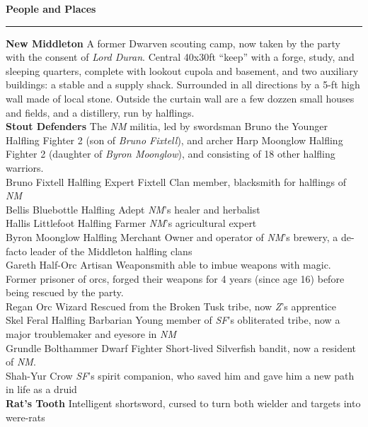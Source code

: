 \documentclass[letterpaper]{article}
\newcommand{\e}[1]{\emph{#1}}
\newcommand{\B}[1]{\textbf{#1}}
\newenvironment{notesection}[1]
{ {\huge \B{#1}}\hrule\vspace{0.5em}\begingroup\fontsize{9pt}{12pt}\selectfont}
{\endgroup}
\newcommand{\person}[3]{#1\B{
    \ifstrequal{#2}{M}{{\color{ProcessBlue}\male}}{%
    \ifstrequal{#2}{F}{\color{VioletRed}\female}{}}} #3}
\begin{document}
\begin{notesection}{People and Places}
\B{New Middleton} A former Dwarven scouting camp, now taken by the party with the consent of \e{Lord Duran}.  Central 40x30ft ``keep'' with a forge, study, and sleeping quarters, complete with lookout cupola and basement, and two auxiliary buildings: a stable and a supply shack. Surrounded in all directions by a 5-ft high wall made of local stone. Outside the curtain wall are a few dozzen small houses and fields, and a distillery, run by halflings. \\
\B{Stout Defenders} The \e{NM} militia, led by swordsman \person{Bruno the Younger}{M}{Halfling Fighter 2} (son of \e{Bruno Fixtell}), and archer \person{Harp Moonglow}{F}{Halfling Fighter 2} (daughter of \e{Byron Moonglow}), and consisting of 18 other halfling warriors.\\
\person{Bruno Fixtell}{M}{Halfling Expert} Fixtell Clan member, blacksmith for halflings of \e{NM} \\
\person{Bellis Bluebottle}{F}{Halfling Adept} \e{NM}'s healer and herbalist \\
\person{Hallis Littlefoot}{F}{Halfling Farmer} \e{NM}'s agricultural expert \\
\person{Byron Moonglow}{M}{Halfling Merchant} Owner and operator of \e{NM}'s brewery, a de-facto leader of the Middleton halfling clans \\
\person{Gareth}{M}{Half-Orc Artisan} Weaponsmith able to imbue weapons with magic. Former prisoner of orcs, forged their weapons for 4 years (since age 16) before being rescued by the party. \\
\person{Regan}{M}{Orc Wizard} Rescued from the Broken Tusk tribe, now \e{Z}'s apprentice \\
\person{Skel}{M}{Feral Halfling Barbarian} Young member of \e{SF}'s obliterated tribe, now a major troublemaker and eyesore in \e{NM} \\
\person{Grundle Bolthammer}{F}{Dwarf Fighter} Short-lived Silverfish bandit, now a resident of \e{NM}.\\
\person{Shah-Yur}{M}{Crow} \e{SF}'s spirit companion, who saved him and gave him a new path in life as a druid\\
\B{Rat's Tooth} Intelligent shortsword, cursed to turn both wielder and targets into were-rats\\


\end{notesection}
\end{document}

